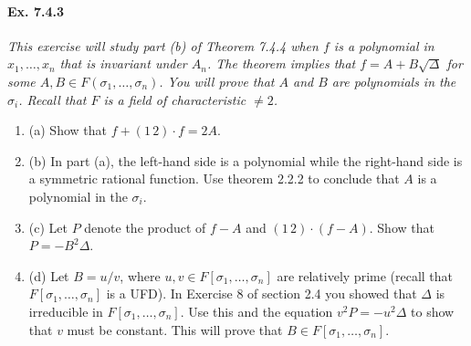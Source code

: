\documentclass[11pt,a4paper]{article}
\newcommand{\be} {\begin{enumerate}}
\newcommand{\ee} {\end{enumerate}}
\begin{document}
\paragraph{Ex. 7.4.3}

{\it This exercise will study part (b) of Theorem 7.4.4 when $f$ is a polynomial in $x_1,\ldots,x_n$ that is invariant under $A_n$. The theorem implies that $f = A+B\sqrt{\Delta}$ for some $A,B \in F(\sigma_1,\ldots,\sigma_n)$. You will prove that $A$ and $B$ are polynomials in the $\sigma_i$. Recall that $F$ is a field of characteristic $\ne 2$.
\be
\item[(a)] Show that $f + (1\,  2)\cdot f = 2A$.
\item[(b)] In part (a), the left-hand side is a polynomial while the right-hand side is a symmetric rational function. Use theorem 2.2.2 to conclude that $A$ is a polynomial in the $\sigma_i$.
\item[(c)] Let $P$ denote the product of $f-A$ and $(1\,2)\cdot (f-A)$. Show that $P = -B^2\Delta$.
\item[(d)] Let $B = u/v$, where $u,v \in F[\sigma_1,\ldots, \sigma_n]$ are relatively prime (recall that $F[\sigma_1,\ldots,\sigma_n]$ is a UFD). In Exercise 8 of section 2.4 you showed that $\Delta$ is irreducible in $F[\sigma_1,\ldots,\sigma_n]$. Use this and the equation $v^2P =-u^2\Delta$ to show that $v$ must be constant. This will prove that $B\in F[\sigma_1,\ldots,\sigma_n]$.
\ee
}
\end{document}

